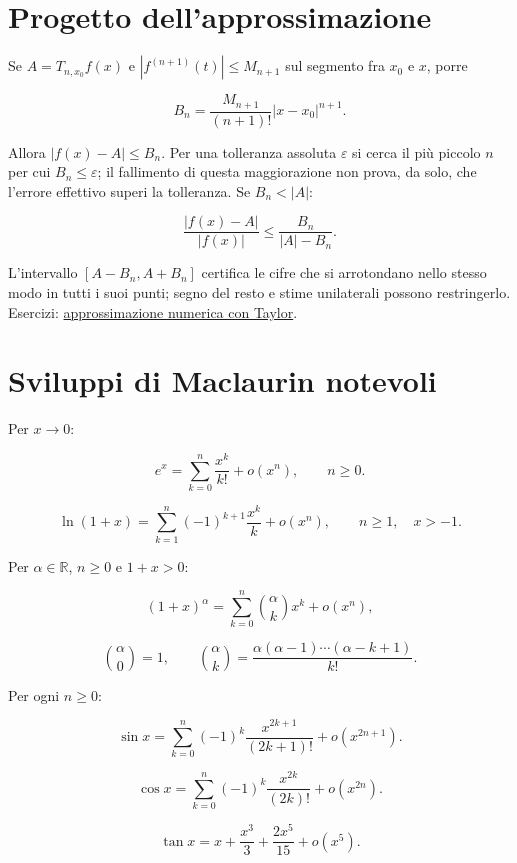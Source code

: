 \section{Progetto dell'approssimazione}\label{progetto-dellapprossimazione}

Se \(A=T_{n,x_0}f(x)\) e \(|f^{(n+1)}(t)|\le M_{n+1}\) sul segmento fra \(x_0\) e \(x\), porre

\[
B_n=\dfrac{M_{n+1}}{(n+1)!}|x-x_0|^{n+1}.
\]

Allora \(|f(x)-A|\le B_n\). Per una tolleranza assoluta \(\varepsilon\) si cerca il più piccolo \(n\) per cui \(B_n\le\varepsilon\); il fallimento di questa maggiorazione non prova, da solo, che l'errore effettivo superi la tolleranza. Se \(B_n<|A|\):

\[
\dfrac{|f(x)-A|}{|f(x)|}
\le
\dfrac{B_n}{|A|-B_n}.
\]

L'intervallo \([A-B_n,A+B_n]\) certifica le cifre che si arrotondano nello stesso modo in tutti i suoi punti; segno del resto e stime unilaterali possono restringerlo. Esercizi: \href{https://ingegnerismo.it/matematica/approssimazione-numerica-con-taylor-esercizi/}{approssimazione numerica con Taylor}.

\section{Sviluppi di Maclaurin notevoli}\label{sviluppi-di-maclaurin-notevoli}

Per \(x\to0\):

\[
\displaystyle
e^x=\sum_{k=0}^{n}\frac{x^k}{k!}+o(x^n),
\qquad n\ge0.
\]

\[
\displaystyle
\ln(1+x)
=
\sum_{k=1}^{n}(-1)^{k+1}\frac{x^k}{k}+o(x^n),
\qquad n\ge1,
\quad x>-1.
\]

Per \(\alpha\in\mathbb R\), \(n\ge0\) e \(1+x>0\):

\[
\displaystyle
(1+x)^\alpha
=
\sum_{k=0}^{n}\binom{\alpha}{k}x^k+o(x^n),
\]

\[
\displaystyle
\binom{\alpha}{0}=1,
\qquad
\binom{\alpha}{k}
=
\frac{\alpha(\alpha-1)\cdots(\alpha-k+1)}{k!}.
\]

Per ogni \(n\ge0\):

\[
\displaystyle
\sin x
=
\sum_{k=0}^{n}(-1)^k\frac{x^{2k+1}}{(2k+1)!}
+o(x^{2n+1}).
\]

\[
\displaystyle
\cos x
=
\sum_{k=0}^{n}(-1)^k\frac{x^{2k}}{(2k)!}
+o(x^{2n}).
\]

\[
\displaystyle
\tan x=x+\frac{x^3}{3}+\frac{2x^5}{15}+o(x^5).
\]

